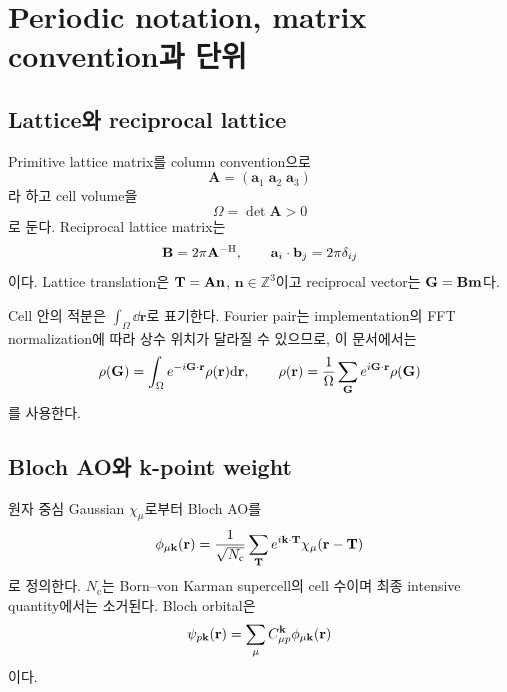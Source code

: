 \section{Periodic notation, matrix convention과 단위}
\label{sec:notation}

\subsection{Lattice와 reciprocal lattice}

Primitive lattice matrix를 column convention으로
\begin{equation}
  \mathbf A=(\mathbf a_1\;\mathbf a_2\;\mathbf a_3)
\end{equation}
라 하고 cell volume을
\begin{equation}
  \Omega=\det\mathbf A>0
  \label{eq:cell-volume}
\end{equation}
로 둔다. Reciprocal lattice matrix는
\begin{equation}
  \mathbf B=2\pi\mathbf A^{-\mathrm{H}},
  \qquad
  \mathbf a_i\cdot\mathbf b_j=2\pi\delta_{ij}
  \label{eq:reciprocal-lattice}
\end{equation}
이다. Lattice translation은 $\mathbf{T}=\mathbf A\mathbf n$,
$\mathbf n\in\mathbb Z^3$이고 reciprocal vector는 $\mathbf{G}=\mathbf B\mathbf m$다.

Cell 안의 적분은 $\int_\Omega\dd\mathbf r$로 표기한다. Fourier pair는 implementation의
FFT normalization에 따라 상수 위치가 달라질 수 있으므로, 이 문서에서는
\begin{equation}
  \rho(\mathbf{G})=\int_\Omega e^{-i\mathbf{G}\cdot\mathbf r}\rho(\mathbf r)\mathrm{d}\mathbf r,
  \qquad
  \rho(\mathbf r)=\frac{1}{\Omega}\sum_{\mathbf{G}}
  e^{i\mathbf{G}\cdot\mathbf r}\rho(\mathbf{G})
  \label{eq:fourier-pair}
\end{equation}
를 사용한다.

\subsection{Bloch AO와 k-point weight}

원자 중심 Gaussian $\chi_\mu$로부터 Bloch AO를
\begin{equation}
  \phi_{\mu\mathbf{k}}(\mathbf r)
  =\frac{1}{\sqrt{N_{\mathrm c}}}
   \sum_{\mathbf{T}}e^{i\mathbf{k}\cdot\mathbf{T}}
   \chi_\mu(\mathbf r-\mathbf{T})
  \label{eq:bloch-ao}
\end{equation}
로 정의한다. $N_{\mathrm c}$는 Born--von Karman supercell의 cell 수이며 최종 intensive
quantity에서는 소거된다. Bloch orbital은
\begin{equation}
  \psi_{p\mathbf{k}}(\mathbf r)
  =\sum_\mu C_{\mu p}^{\mathbf{k}}\phi_{\mu\mathbf{k}}(\mathbf r)
  \label{eq:bloch-mo}
\end{equation}
이다.

